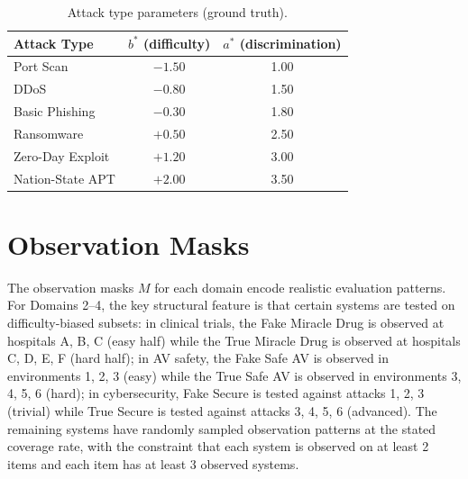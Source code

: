 \documentclass[11pt,a4paper]{article}
\begin{document}
\begin{table}[h]
\centering
\caption{Attack type parameters (ground truth).}
\small
\begin{tabular}{lcc}
\toprule
Attack Type & $b^*$ (difficulty) & $a^*$ (discrimination) \\
\midrule
Port Scan & $-1.50$ & 1.00 \\
DDoS & $-0.80$ & 1.50 \\
Basic Phishing & $-0.30$ & 1.80 \\
Ransomware & $+0.50$ & 2.50 \\
Zero-Day Exploit & $+1.20$ & 3.00 \\
Nation-State APT & $+2.00$ & 3.50 \\
\bottomrule
\end{tabular}
\end{table}

\section{Observation Masks}

The observation masks $M$ for each domain encode realistic evaluation patterns. For Domains 2--4, the key structural feature is that certain systems are tested on difficulty-biased subsets: in clinical trials, the Fake Miracle Drug is observed at hospitals A, B, C (easy half) while the True Miracle Drug is observed at hospitals C, D, E, F (hard half); in AV safety, the Fake Safe AV is observed in environments 1, 2, 3 (easy) while the True Safe AV is observed in environments 3, 4, 5, 6 (hard); in cybersecurity, Fake Secure is tested against attacks 1, 2, 3 (trivial) while True Secure is tested against attacks 3, 4, 5, 6 (advanced). The remaining systems have randomly sampled observation patterns at the stated coverage rate, with the constraint that each system is observed on at least 2 items and each item has at least 3 observed systems.
\end{document}

